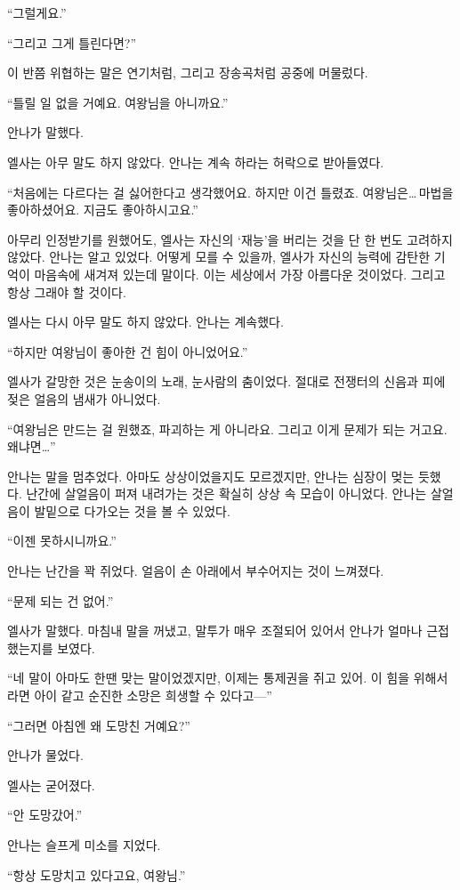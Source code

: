 ``그럴게요.''

``그리고 그게 틀린다면?''

이 반쯤 위협하는 말은 연기처럼, 그리고 장송곡처럼 공중에 머물렀다.

``틀릴 일 없을 거예요. 여왕님을 아니까요.''

안나가 말했다.

엘사는 아무 말도 하지 않았다. 안나는 계속 하라는 허락으로 받아들였다.

``처음에는 다르다는 걸 싫어한다고 생각했어요. 하지만 이건 틀렸죠. 여왕님은\ldots\,마법을 좋아하셨어요. 지금도 좋아하시고요.''

아무리 인정받기를 원했어도, 엘사는 자신의 `재능'을 버리는 것을 단 한 번도 고려하지 않았다. 안나는 알고 있었다. 어떻게 모를 수 있을까, 엘사가 자신의 능력에 감탄한 기억이 마음속에 새겨져 있는데 말이다. 이는 세상에서 가장 아름다운 것이었다. 그리고 항상 그래야 할 것이다.

엘사는 다시 아무 말도 하지 않았다. 안나는 계속했다.

``하지만 여왕님이 좋아한 건 힘이 아니었어요.''

엘사가 갈망한 것은 눈송이의 노래, 눈사람의 춤이었다. 절대로 전쟁터의 신음과 피에 젖은 얼음의 냄새가 아니었다.

``여왕님은 만드는 걸 원했죠, 파괴하는 게 아니라요. 그리고 이게 문제가 되는 거고요. 왜냐면\ldots''

안나는 말을 멈추었다. 아마도 상상이었을지도 모르겠지만, 안나는 심장이 멎는 듯했다. 난간에 살얼음이 퍼져 내려가는 것은 확실히 상상 속 모습이 아니었다. 안나는 살얼음이 발밑으로 다가오는 것을 볼 수 있었다.

``이젠 못하시니까요.''

안나는 난간을 꽉 쥐었다. 얼음이 손 아래에서 부수어지는 것이 느껴졌다.

``문제 되는 건 없어.''

엘사가 말했다. 마침내 말을 꺼냈고, 말투가 매우 조절되어 있어서 안나가 얼마나 근접했는지를 보였다.

``네 말이 아마도 한땐 맞는 말이었겠지만, 이제는 통제권을 쥐고 있어. 이 힘을 위해서라면 아이 같고 순진한 소망은 희생할 수 있다고—''

``그러면 아침엔 왜 도망친 거예요?''

안나가 물었다.

엘사는 굳어졌다.

``안 도망갔어.''

안나는 슬프게 미소를 지었다.

``항상 도망치고 있다고요, 여왕님.''

